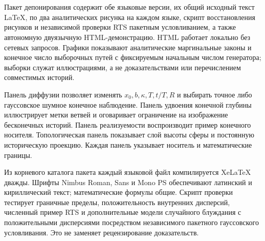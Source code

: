 \appendix
\section{}
\label{sec:reproduce}
{Пакет депонирования содержит обе языковые версии, их общий исходный текст LaTeX, по два аналитических рисунка на каждом языке, скрипт восстановления рисунков и независимой проверки RTS пакетным условливанием, а также автономную двуязычную HTML-демонстрацию. HTML работает локально без сетевых запросов. Графики показывают аналитические маргинальные законы и конечное число выборочных путей с фиксируемым начальным числом генератора; выборки служат иллюстрациями, а не доказательствами или перечислением совместимых историй.}

{Панель диффузии позволяет изменять $x_0,b,\kappa,T,t/T,R$ и выбирать точное либо гауссовское шумное конечное наблюдение. Панель удвоения конечной глубины иллюстрирует метки ветвей и оговаривает ограничение на изображение бесконечных историй. Панель реализуемости воспроизводит пример конечного носителя. Топологическая панель показывает слой высоты сферы и постоянную историческую проекцию. Каждая панель указывает носитель и математические границы.}

{Из корневого каталога пакета каждый языковой файл компилируется XeLaTeX дважды. Шрифты Nimbus Roman, Sans и Mono PS обеспечивают латинский и кириллический текст; математические формулы общие. Скрипт проверки тестирует граничные пределы, положительность внутренних дисперсий, численный пример RTS и дополнительные модели случайного блуждания с положительными дисперсиями посредством независимого пакетного гауссовского условливания. Это не заменяет рецензирование доказательств.}

